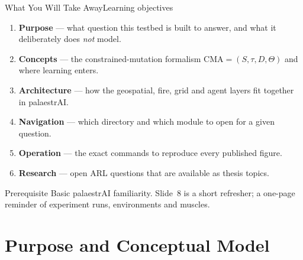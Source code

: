 \documentclass[aspectratio=169,9pt]{beamer}
\begin{document}
\begin{frame}{What You Will Take Away}{Learning objectives}
  \begin{enumerate}
    \item \textbf{Purpose} --- what question this testbed is built to answer,
          and what it deliberately does \emph{not} model.
    \item \textbf{Concepts} --- the constrained-mutation formalism
          $\mathrm{CMA}=(S,\tau,D,\Theta)$ and where learning enters.
    \item \textbf{Architecture} --- how the geospatial, fire, grid and
          agent layers fit together in palaestrAI.
    \item \textbf{Navigation} --- which directory and which module to open
          for a given question.
    \item \textbf{Operation} --- the exact commands to reproduce every
          published figure.
    \item \textbf{Research} --- open ARL questions that are available as
          thesis topics.
  \end{enumerate}
  \vskip6pt
  \begin{block}{Prerequisite}
    \small Basic palaestrAI familiarity. Slide~8 is a short refresher; a
    one-page reminder of experiment runs, environments and muscles.
  \end{block}
\end{frame}

\section{Purpose and Conceptual Model}
\end{document}
